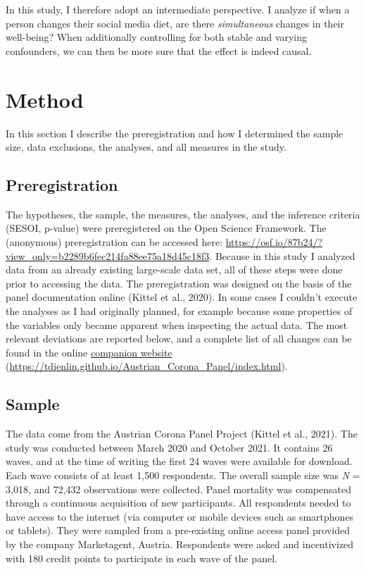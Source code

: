 \documentclass[
  english,
  man,floatsintext]{apa6}
\begin{document}
In this study, I therefore adopt an intermediate perspective.
I analyze if when a person changes their social media diet, are there \emph{simultaneous} changes in their well-being?
When additionally controlling for both stable and varying confounders, we can then be more sure that the effect is indeed causal.

\hypertarget{method}{%
\section{Method}\label{method}}

In this section I describe the preregistration and how I determined the sample size, data exclusions, the analyses, and all measures in the study.

\hypertarget{preregistration}{%
\subsection{Preregistration}\label{preregistration}}

The hypotheses, the sample, the measures, the analyses, and the inference criteria (SESOI, p-value) were preregistered on the Open Science Framework.
The (anonymous) preregistration can be accessed here: \url{https://osf.io/87b24/?view_only=b2289b6fec214fa88ee75a18d45c18f3}.
Because in this study I analyzed data from an already existing large-scale data set, all of these steps were done prior to accessing the data.
The preregistration was designed on the basis of the panel documentation online (Kittel et al., 2020).
In some cases I couldn't execute the analyses as I had originally planned, for example because some properties of the variables only became apparent when inspecting the actual data.
The most relevant deviations are reported below, and a complete list of all changes can be found in the online \href{https://tdienlin.github.io/Austrian_Corona_Panel/index.html}{companion website} (\url{https://tdienlin.github.io/Austrian_Corona_Panel/index.html}).

\hypertarget{sample}{%
\subsection{Sample}\label{sample}}

The data come from the Austrian Corona Panel Project (Kittel et al., 2021).
The study was conducted between March 2020 and October 2021.
It contains 26 waves, and at the time of writing the first 24 waves were available for download.
Each wave consists of at least 1,500 respondents.
The overall sample size was \emph{N} = 3,018, and 72,432 observations were collected.
Panel mortality was compensated through a continuous acquisition of new participants.
All respondents needed to have access to the internet (via computer or mobile devices such as smartphones or tablets).
They were sampled from a pre-existing online access panel provided by the company Marketagent, Austria.
Respondents were asked and incentivized with 180 credit points to participate in each wave of the panel.
\end{document}
